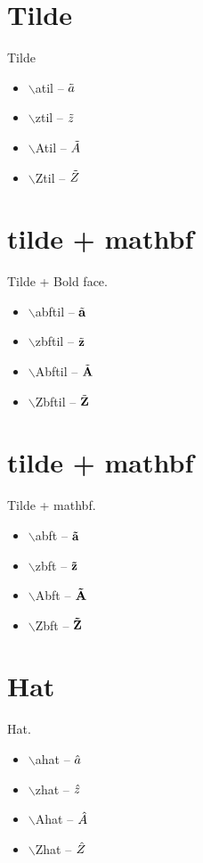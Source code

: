\documentclass[twocolumn, a4paper]{article}
\begin{document}
	\section{Tilde}
	Tilde
	\begin{itemize} 
		\item $\backslash$atil -- $\tilde{a}$
		\item $\backslash$ztil -- $\tilde{z}$  
		\item $\backslash$Atil -- $\tilde{A}$
		\item $\backslash$Ztil -- $\tilde{Z}$  
	\end{itemize}
	
	\section{tilde + mathbf}
	Tilde + Bold face.
	\begin{itemize} 
		\item $\backslash$abftil -- $\tilde{\mathbf{a}}$
		\item $\backslash$zbftil -- $\tilde{\mathbf{z}}$  
		\item $\backslash$Abftil -- $\tilde{\mathbf{A}}$
		\item $\backslash$Zbftil -- $\tilde{\mathbf{Z}}$  
	\end{itemize}

	\section{tilde + mathbf}
	Tilde + mathbf.
	\begin{itemize} 
		\item $\backslash$abft -- $\mathbf{\tilde a}$
		\item $\backslash$zbft -- $\mathbf{\tilde z}$  
		\item $\backslash$Abft -- $\mathbf{\tilde A}$
		\item $\backslash$Zbft -- $\mathbf{\tilde Z}$  
	\end{itemize}

	\section{Hat}
	Hat.
	\begin{itemize} 
		\item $\backslash$ahat -- $\hat{a}$
		\item $\backslash$zhat -- $\hat{z}$  
		\item $\backslash$Ahat -- $\hat{A}$
		\item $\backslash$Zhat -- $\hat{Z}$  
	\end{itemize}
	
\end{document}
